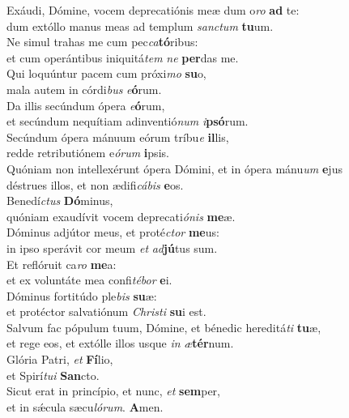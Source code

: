 \evenverse Exáudi, Dómine, vocem deprecatiónis meæ dum o\textit{ro} \textbf{ad} te:~\*\\
\evenverse dum extóllo manus meas ad templum \textit{san}\textit{ctum} \textbf{tu}um.\\
\oddverse Ne simul trahas me cum pec\textit{ca}\textbf{tó}ribus:~\*\\
\oddverse et cum operántibus iniquitá\textit{tem} \textit{ne} \textbf{per}das me.\\
\evenverse Qui loquúntur pacem cum próxi\textit{mo} \textbf{su}o,~\*\\
\evenverse mala autem in córdi\textit{bus} \textit{e}\textbf{ó}rum.\\
\oddverse Da illis secúndum ópera \textit{e}\textbf{ó}rum,~\*\\
\oddverse et secúndum nequítiam adinventió\textit{num} \textit{i}\textbf{psó}rum.\\
\evenverse Secúndum ópera mánuum eórum tríbu\textit{e} \textbf{il}lis,~\*\\
\evenverse redde retributiónem e\textit{ó}\textit{rum} \textbf{i}psis.\\
\oddverse Quóniam non intellexérunt ópera Dómini, et in ópera mánu\textit{um} \textbf{e}jus~\*\\
\oddverse déstrues illos, et non ædifi\textit{cá}\textit{bis} \textbf{e}os.\\
\evenverse Benedí\textit{ctus} \textbf{Dó}minus,~\*\\
\evenverse quóniam exaudívit vocem deprecati\textit{ó}\textit{nis} \textbf{me}æ.\\
\oddverse Dóminus adjútor meus, et proté\textit{ctor} \textbf{me}us:~\*\\
\oddverse in ipso sperávit cor meum \textit{et} \textit{ad}\textbf{jú}tus sum.\\
\evenverse Et reflóruit ca\textit{ro} \textbf{me}a:~\*\\
\evenverse et ex voluntáte mea confi\textit{té}\textit{bor} \textbf{e}i.\\
\oddverse Dóminus fortitúdo ple\textit{bis} \textbf{su}æ:~\*\\
\oddverse et protéctor salvatiónum \textit{Chri}\textit{sti} \textbf{su}i est.\\
\evenverse Salvum fac pópulum tuum, Dómine, et bénedic hereditá\textit{ti} \textbf{tu}æ,~\*\\
\evenverse et rege eos, et extólle illos usque \textit{in} \textit{æ}\textbf{tér}num.\\
\oddverse Glória Patri, \textit{et} \textbf{Fí}lio,~\*\\
\oddverse et Spirí\textit{tu}\textit{i} \textbf{San}cto.\\
\evenverse Sicut erat in princípio, et nunc, \textit{et} \textbf{sem}per,~\*\\
\evenverse et in sǽcula sæcu\textit{ló}\textit{rum}. \textbf{A}men.\\
